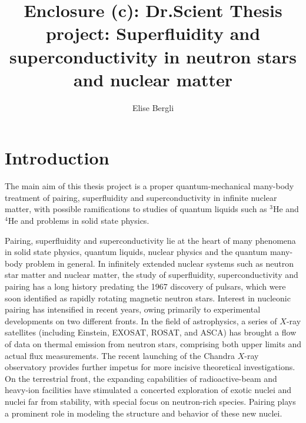\documentclass{svmult}
\begin{document}
\title*{Enclosure (c): Dr.Scient Thesis project: Superfluidity and superconductivity in neutron stars and nuclear matter}

\author{Elise Bergli}


\maketitle  



\section{Introduction}

The main aim of 
this thesis project is a proper 
quantum-mechanical 
many-body treatment of pairing, superfluidity and superconductivity
in infinite nuclear matter, with possible ramifications to studies
of quantum liquids such as $^3$He and $^4$He 
and problems in solid state physics.

Pairing, superfluidity and superconductivity  lie
at the heart of many phenomena in solid state physics, quantum liquids, 
nuclear physics and the quantum
many-body problem in general. 
In infinitely extended nuclear systems such as neutron star matter 
and nuclear matter, 
the study of superfluidity, superconductivity and pairing has a 
long history predating the 1967 discovery of pulsars, 
which were soon identified as rapidly rotating magnetic neutron 
stars.  Interest in nucleonic pairing has intensified 
in recent years, owing primarily to experimental developments on two 
different fronts.  In the field of astrophysics, a series of $X$-ray 
satellites (including Einstein, EXOSAT, ROSAT, and ASCA) has brought a 
flow of data on thermal emission from neutron stars, comprising both upper 
limits and actual flux measurements.  The recent launching of the 
Chandra $X$-ray observatory provides further impetus for more incisive 
theoretical investigations.  On the terrestrial 
front, the expanding capabilities of radioactive-beam and heavy-ion 
facilities have stimulated a concerted exploration of exotic nuclei and 
nuclei far from stability, with special focus on neutron-rich species. 
Pairing plays a prominent role in modeling 
the structure and behavior of these new nuclei.  
\end{document}
